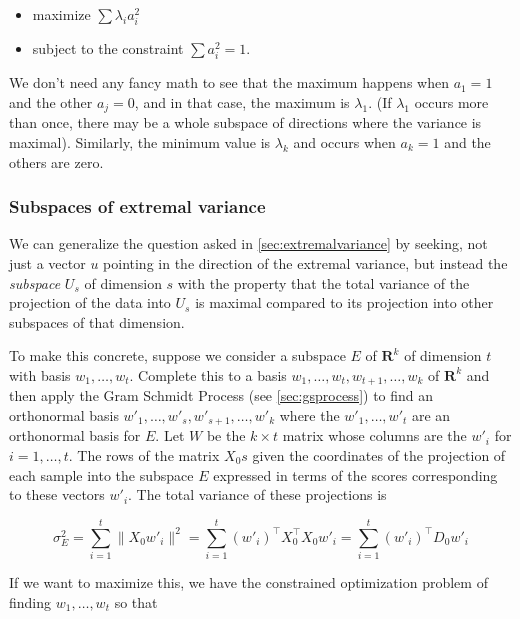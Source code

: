 \documentclass[
]{article}
\providecommand{\tightlist}{%
  \setlength{\itemsep}{0pt}\setlength{\parskip}{0pt}}
\begin{document}
\begin{itemize}
\tightlist
\item
  maximize \(\sum \lambda_{i}a_{i}^2\)
\item
  subject to the constraint \(\sum a_{i}^2 = 1\).
\end{itemize}

We don't need any fancy math to see that the maximum happens when
\(a_{1}=1\) and the other \(a_{j}=0\), and in that case, the maximum is
\(\lambda_{1}\). (If \(\lambda_{1}\) occurs more than once, there may be
a whole subspace of directions where the variance is maximal).
Similarly, the minimum value is \(\lambda_{k}\) and occurs when
\(a_{k}=1\) and the others are zero.

\hypertarget{sec:subspaces}{%
\subsubsection{Subspaces of extremal variance}\label{sec:subspaces}}

We can generalize the question asked in \cref{sec:extremalvariance} by
seeking, not just a vector \(u\) pointing in the direction of the
extremal variance, but instead the \emph{subspace} \(U_{s}\) of
dimension \(s\) with the property that the total variance of the
projection of the data into \(U_{s}\) is maximal compared to its
projection into other subspaces of that dimension.

To make this concrete, suppose we consider a subspace \(E\) of
\(\mathbf{R}^{k}\) of dimension \(t\) with basis
\(w_{1},\ldots, w_{t}\). Complete this to a basis
\(w_{1},\ldots, w_{t},w_{t+1},\ldots, w_{k}\) of \(\mathbf{R}^{k}\) and
then apply the Gram Schmidt Process (see \cref{sec:gsprocess}) to find
an orthonormal basis \(w'_{1},\ldots,w'_{s},w'_{s+1},\ldots, w'_{k}\)
where the \(w'_{1},\ldots, w'_{t}\) are an orthonormal basis for \(E\).
Let \(W\) be the \(k\times t\) matrix whose columns are the \(w'_{i}\)
for \(i=1,\ldots,t\). The rows of the matrix \(X_{0}s\) given the
coordinates of the projection of each sample into the subspace \(E\)
expressed in terms of the scores corresponding to these vectors
\(w'_{i}\). The total variance of these projections is

\[
\sigma_{E}^2 = \sum_{i=1}^{t} \|X_{0}w'_{i}\|^2 = \sum_{i=1}^{t} (w'_{i})^{\intercal}X_{0}^{\intercal}X_{0}w'_{i}  = \sum_{i=1}^{t} (w'_{i})^{\intercal}D_{0}w'_{i}
\]

If we want to maximize this, we have the constrained optimization
problem of finding \(w_{1},\ldots, w_{t}\) so that
\end{document}
